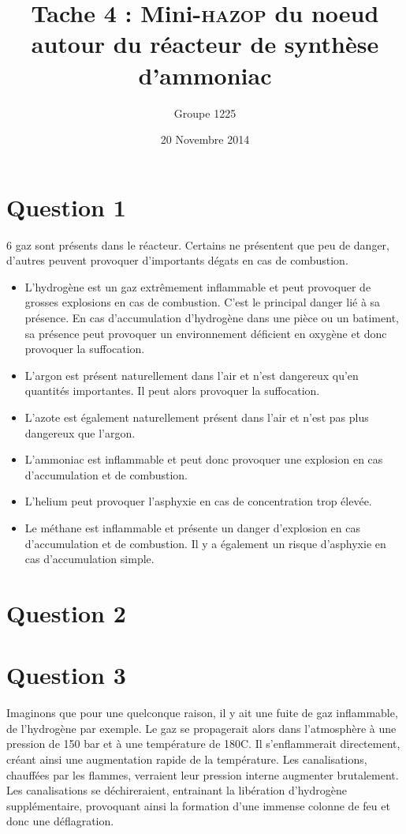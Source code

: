 \documentclass[a4paper,oneside,12pt]{article}
\title{Tache 4 : Mini-\textsc{hazop} du noeud autour du réacteur de synthèse d'ammoniac}
\author{Groupe 1225}
\date{20 Novembre 2014}
\begin{document}
\maketitle

\section*{Question 1}

6 gaz sont présents dans le réacteur. Certains ne présentent que peu de danger, d'autres peuvent provoquer d'importants dégats en cas de combustion.
\begin{itemize}
\item L'hydrogène est un gaz extrêmement inflammable et peut provoquer de grosses explosions en cas de combustion. C'est le principal danger lié à sa présence.
En cas d'accumulation d'hydrogène dans une pièce ou un batiment, sa présence peut provoquer un environnement déficient en oxygène et donc provoquer la suffocation.

\item  L'argon est présent naturellement dans l'air et n'est dangereux qu'en quantités importantes. Il peut alors provoquer la suffocation.

\item  L'azote est également naturellement présent dans l'air et n'est pas plus dangereux que l'argon.

\item  L'ammoniac est inflammable et peut donc provoquer une explosion en cas d'accumulation et de combustion.

\item  L'helium peut provoquer l'asphyxie en cas de concentration trop élevée.

\item  Le méthane est inflammable et présente un danger d'explosion en cas d'accumulation et de combustion. Il y a également un risque d'asphyxie en cas d'accumulation simple.
\end{itemize}

\section*{Question 2}

\section*{Question 3}

Imaginons que pour une quelconque raison, il y ait une fuite de gaz inflammable, de l'hydrogène par exemple. Le gaz se propagerait alors dans l'atmosphère à une pression de 150 bar et à une température de 180{\degre}C. Il s'enflammerait directement, créant ainsi une augmentation rapide de la température. Les canalisations, chauffées par les flammes, verraient leur pression interne augmenter brutalement. Les canalisations se déchireraient, entrainant la libération d'hydrogène supplémentaire, provoquant ainsi la formation d'une immense colonne de feu et donc une déflagration.
\end{document}
